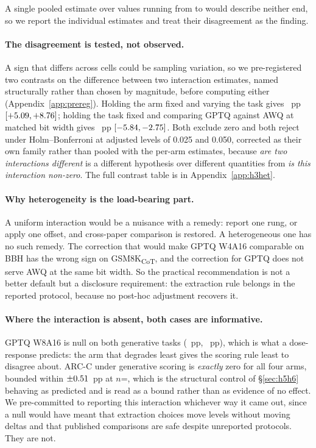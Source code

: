 \documentclass[11pt]{article}
\begin{document}
A single pooled estimate over values running from \hThreeBbhGptqFour{} to
\hThreeGsmNfFour{} would describe neither end, so we report the individual estimates
and treat their disagreement as the finding.

\paragraph{The disagreement is tested, not observed.}
A sign that differs across cells could be sampling variation, so we
pre-registered two contrasts on the difference between two interaction estimates,
named structurally rather than chosen by magnitude, before computing either
(Appendix~\ref{app:prereg}). Holding the arm fixed and varying the task gives
\hThreeHetTasks{}~pp $[+5.09, +8.76]$; holding the task
fixed and comparing GPTQ against AWQ at matched bit width gives
\hThreeHetArms{}~pp $[-5.84, -2.75]$. Both exclude zero and both
reject under Holm--Bonferroni at adjusted levels of 0.025 and 0.050, corrected as
their own family rather than pooled with the per-arm estimates, because
\emph{are two interactions different} is a different hypothesis over different
quantities from \emph{is this interaction non-zero}. The full contrast table is
in Appendix~\ref{app:h3het}.

\paragraph{Why heterogeneity is the load-bearing part.}
A uniform interaction would be a nuisance with a remedy: report one rung,
or apply one offset, and cross-paper comparison is restored. A heterogeneous one
has no such remedy. The correction that would make GPTQ W4A16 comparable on BBH
has the wrong sign on GSM8K\textsubscript{CoT}, and the correction for GPTQ does
not serve AWQ at the same bit width. So the practical recommendation is not a
better default but a disclosure requirement: the extraction rule belongs in the
reported protocol, because no post-hoc adjustment recovers it.

\paragraph{Where the interaction is absent, both cases are informative.}
GPTQ W8A16 is null on both generative tasks (\hThreeBbhGptqEight{}~pp,
\hThreeGsmGptqEight{}~pp), which is what a dose-response predicts: the arm that
degrades least gives the scoring rule least to disagree about. ARC-C under
generative scoring is \emph{exactly} zero for all four arms, bounded within
$\pm0.51$~pp at $n$=\hThreeArcN, which is the structural control of
\S\ref{sec:h5h6} behaving as predicted and is read as a bound rather than as
evidence of no effect. We pre-committed to reporting this interaction whichever
way it came out, since a null would have meant that extraction choices move
levels without moving deltas and that published comparisons are safe despite
unreported protocols. They are not.
\end{document}
